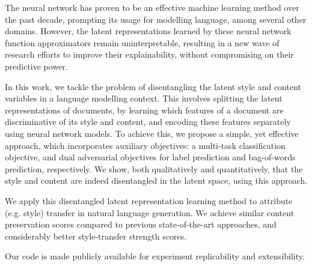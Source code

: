 The neural network has proven to be an effective machine learning method over the past decade, prompting its usage for modelling language, among several other domains. However, the latent representations learned by these neural network function approximators remain uninterpretable, resulting in a new wave of research efforts to improve their explainability, without compromising on their predictive power.

In this work, we tackle the problem of disentangling the latent style and content variables in a language modelling context. This involves splitting the latent representations of documents, by learning which features of a document are discriminative of its style and content, and encoding these features separately using neural network models. To achieve this, we propose a simple, yet effective approach, which incorporates auxiliary objectives: a multi-task classification objective, and dual adversarial objectives for label prediction and bag-of-words prediction, respectively. We show, both qualitatively and quantitatively, that the style and content are indeed disentangled in the latent space, using this approach.

We apply this disentangled latent representation learning method to attribute (e.g. style) transfer in natural language generation. We achieve similar content preservation scores compared to previous state-of-the-art approaches, and considerably better style-transfer strength scores.

Our code is made publicly available for experiment replicability and extensibility.
